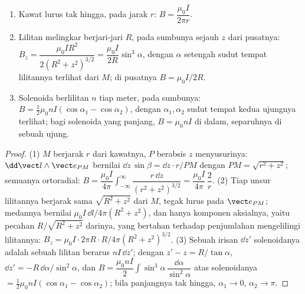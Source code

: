\begin{proposition}\label{prop:b1:magnetostatics:three}
\begin{enumerate}
  \item Kawat lurus tak hingga, pada jarak $r$: $B = \dfrac{\mu_0I}{2\pi r}$.
  \item Lilitan melingkar berjari-jari $R$, pada sumbunya sejauh $z$ dari
        pusatnya: $B_z = \dfrac{\mu_0IR^2}{2(R^2 + z^2)^{3/2}} = \dfrac{\mu_0I}{2R}
        \sin^3\alpha$, dengan $\alpha$ setengah sudut tempat lilitannya
        terlihat dari $M$; di pusatnya $B = \mu_0I/2R$.
  \item Solenoida berlilitan $n$ tiap meter, pada sumbunya: $B = \tfrac12\mu_0nI
        (\cos\alpha_1 - \cos\alpha_2)$, dengan $\alpha_1, \alpha_2$ sudut tempat
        kedua ujungnya terlihat; bagi solenoida yang panjang, $B = \mu_0nI$
        di dalam, separuhnya di sebuah ujung.
\end{enumerate}
\end{proposition}

\begin{proof}
(1) $M$ berjarak $r$ dari kawatnya, $P$ berabsis $z$ menyusurinya:
$\dd\vect l\wedge\vect e_{PM}$ bernilai $\dd z\,\sin\beta = \dd z\cdot r/PM$
dengan $PM = \sqrt{r^2 + z^2}$; semuanya ortoradial:
$B = \dfrac{\mu_0I}{4\pi}\displaystyle\int_{-\infty}^{\infty}\dfrac{r\,\dd z}{(r^2 + z^2)^{3/2}}
= \dfrac{\mu_0I}{4\pi}\,\dfrac{2}{r}$. (2) Tiap unsur lilitannya berjarak
sama $\sqrt{R^2 + z^2}$ dari $M$, tegak lurus pada
$\vect e_{PM}$; medannya bernilai $\mu_0I\,\dd l/4\pi(R^2 + z^2)$, dan
hanya komponen aksialnya, yaitu pecahan $R/\sqrt{R^2 + z^2}$ darinya,
yang bertahan terhadap penjumlahan mengelilingi lilitannya: $B_z = \mu_0I\cdot2\pi R\cdot R/4\pi(R^2 +
z^2)^{3/2}$. (3) Sebuah irisan $\dd z'$ solenoidanya adalah sebuah lilitan berarus
$nI\,\dd z'$; dengan $z' - z = R/\tan\alpha$, $\dd z' = -R\,\dd\alpha/\sin^2\alpha$,
dan $B = \dfrac{\mu_0nI}{2}\displaystyle\int\sin^3\alpha\,\dfrac{\dd\alpha}{\sin^2\alpha}$ atas
solenoidanya $= \tfrac12\mu_0nI(\cos\alpha_1 - \cos\alpha_2)$; bila panjangnya
tak hingga, $\alpha_1 \to 0$, $\alpha_2 \to \pi$.
\end{proof}

